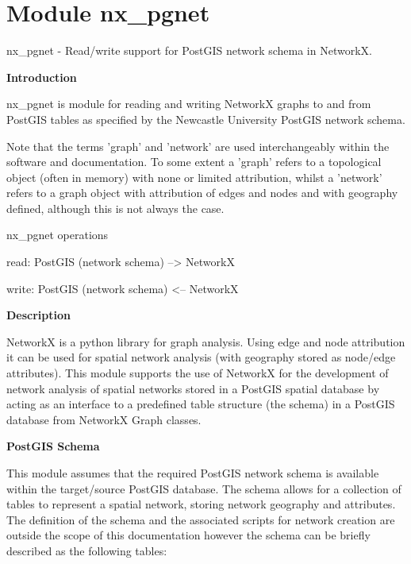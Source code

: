 %
%
%


\section{Module nx\_pgnet}

    \label{nx_pgnet}
nx\_pgnet - Read/write support for PostGIS network schema in NetworkX.

\textbf{Introduction}

nx\_pgnet is module for reading and writing NetworkX graphs to and from 
PostGIS tables as specified by the Newcastle University PostGIS network 
schema.

Note that the terms 'graph' and 'network' are used interchangeably within 
the software and documentation. To some extent a 'graph' refers to a 
topological object (often in memory) with none or limited attribution, 
whilst a 'network' refers to a graph object with attribution of edges and 
nodes and with geography defined, although this is not always the case.

nx\_pgnet operations

read: PostGIS (network schema) --{\textgreater} NetworkX

write: PostGIS (network schema) {\textless}-- NetworkX

\textbf{Description}

NetworkX is a python library for graph analysis. Using edge and node 
attribution it can be used for spatial network analysis (with geography 
stored as node/edge attributes). This module supports the use of NetworkX 
for the development of network analysis of spatial networks stored in a 
PostGIS spatial database by acting as an interface to a predefined table 
structure (the schema) in a PostGIS database from NetworkX Graph classes.

\textbf{PostGIS Schema}

This module assumes that the required PostGIS network schema is available 
within the target/source PostGIS database. The schema allows for a 
collection of tables to represent a spatial network, storing network 
geography and attributes. The definition of the schema and the associated 
scripts for network creation are outside the scope of this documentation 
however the schema can be briefly described as the following tables:

